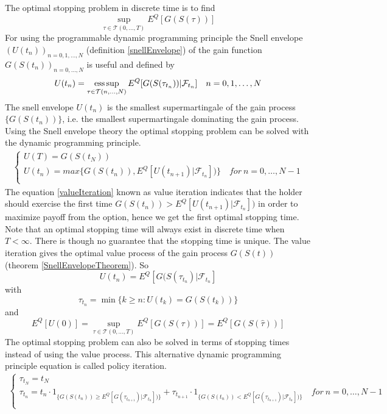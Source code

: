 The optimal stopping problem in discrete time is to find
\begin{equation}\label{Bermudanstop1}
\sup_{\tau \in \mathcal{T}(0,\ldots,T)} E^Q[G(S(\tau))]
\end{equation}
For using the programmable dynamic programming principle the Snell envelope $(U(t_{n}))_{n=0,1,\ldots, N}$ (definition \ref{snellEnvelope}) of the gain function $G(S(t_n))_{n=0,\ldots,N}$ is useful and defined by
$$U(t_n)=\operatorname*{ess\,sup}_{\tau \in \mathcal{T}(n,\ldots, N)} E^Q[G(S(\tau_{t_n}))|\mathcal{F}_{t_n}] \quad n=0,1, \ldots, N$$
The snell envelope $U(t_n)$ is the smallest supermartingale of the gain process $\{G(S(t_n))\}$, i.e. the smallest supermartingale dominating the gain process. Using the Snell envelope theory the optimal stopping problem can be solved with the dynamic programming principle.
\begin{equation}\label{valueIteration}
\begin{split}
\begin{cases}
          U(T) = G(S(t_N))\\
          U(t_n) = max\{ G(S(t_n)), E^Q[U(t_{n+1})|\mathcal{F}_{t_n}])\} \quad for \ n={0,\ldots,N-1} \\ 
\end{cases}
\end{split}
\end{equation}
The equation \eqref{valueIteration} known as value iteration indicates that the holder should exercise the first time $G(S(t_n))> E^Q[U(t_{n+1})|\mathcal{F}_{t_n}])$ in order to maximize payoff from the option, hence we get the first optimal stopping time. Note that an optimal stopping time will always exist in discrete time when $T<\infty$. There is though no guarantee that the stopping time is unique. The value iteration gives the optimal value process of the gain process $G(S(t))$ (theorem \ref{SnellEnvelopeTheorem}). So 
$$U(t_n)=E^Q[G(S(\tau_{t_n})|\mathcal{F}_{t_n}]$$ with 
$$\tau_{t_n}=\min \{ k \geq n : U(t_k)=G(S(t_k)) \}$$ and 
$$E^Q[U(0)]= \sup_{\tau \in \mathcal{T}(0,\ldots, T)} E^Q[G(S(\tau))]=E^Q[G(S(\hat{\tau}))]$$ 
The optimal stopping problem can also be solved in terms of stopping times instead of using the value process. This alternative dynamic programming principle equation is called policy iteration.
\begin{equation}\label{policyIteration}
\begin{split}
\begin{cases}
          \tau_{t_N} = t_N\\
          \tau_{t_n} = t_n \cdot 1_{\{G(S(t_n)) \geq E^Q[G(\tau_{t_{n+1}})|\mathcal{F}_{t_n}])\}} + \tau_{t_{n+1}} \cdot 1_{\{G(S(t_n)) < E^Q[G(\tau_{t_{n+1}})|\mathcal{F}_{t_n}])\}} \quad for \ n={0,\ldots,N-1} \\ 
\end{cases}
\end{split}
\end{equation}

